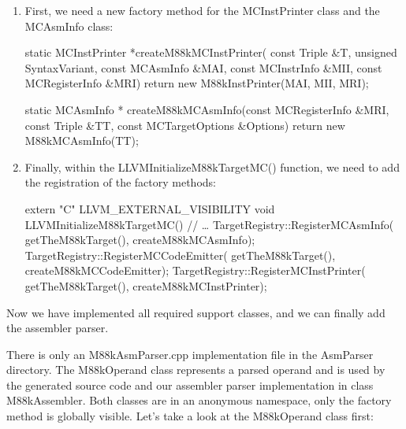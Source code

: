\begin{enumerate}
\item
First, we need a new factory method for the MCInstPrinter class and the MCAsmInfo class:

\begin{cpp}
static MCInstPrinter *createM88kMCInstPrinter(
        const Triple &T, unsigned SyntaxVariant,
        const MCAsmInfo &MAI, const MCInstrInfo &MII,
        const MCRegisterInfo &MRI) {
    return new M88kInstPrinter(MAI, MII, MRI);
}

static MCAsmInfo *
        createM88kMCAsmInfo(const MCRegisterInfo &MRI,
        const Triple &TT,
        const MCTargetOptions &Options) {
    return new M88kMCAsmInfo(TT);
}
\end{cpp}

\item
Finally, within the LLVMInitializeM88kTargetMC() function, we need to add the registration of the factory methods:

\begin{cpp}
extern "C" LLVM_EXTERNAL_VISIBILITY void
LLVMInitializeM88kTargetMC() {
    // …
    TargetRegistry::RegisterMCAsmInfo(
        getTheM88kTarget(), createM88kMCAsmInfo);
    TargetRegistry::RegisterMCCodeEmitter(
        getTheM88kTarget(), createM88kMCCodeEmitter);
    TargetRegistry::RegisterMCInstPrinter(
        getTheM88kTarget(), createM88kMCInstPrinter);
}
\end{cpp}
\end{enumerate}

Now we have implemented all required support classes, and we can finally add the assembler parser.


There is only an M88kAsmParser.cpp implementation file in the AsmParser directory. The M88kOperand class represents a parsed operand and is used by the generated source code and our assembler parser implementation in class M88kAssembler. Both classes are in an anonymous namespace, only the factory method is globally visible. Let’s take a look at the M88kOperand class first:

